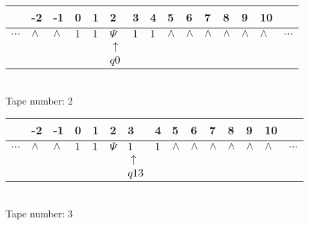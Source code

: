 \documentclass{article}
\begin{document}
\begin{table}[H]
\centering
\begin{tabular}{lllllllllllllll}
 & -2 & -1 & 0 & 1 & 2 & 3 & 4 & 5 & 6 & 7 & 8 & 9 & 10 & \\
\hline
$...$ & \multicolumn{1}{|l|}{$\wedge$} & \multicolumn{1}{|l|}{$\wedge$} & \multicolumn{1}{|l|}{$1$} & \multicolumn{1}{|l|}{$1$} & \multicolumn{1}{|l|}{$\Psi$} & \multicolumn{1}{|l|}{$1$} & \multicolumn{1}{|l|}{$1$} & \multicolumn{1}{|l|}{$\wedge$} & \multicolumn{1}{|l|}{$\wedge$} & \multicolumn{1}{|l|}{$\wedge$} & \multicolumn{1}{|l|}{$\wedge$} & \multicolumn{1}{|l|}{$\wedge$} & \multicolumn{1}{|l|}{$\wedge$} & $...$\\
\hline
&  &  &  &  & $\uparrow$ &  &  &  &  &  &  &  &  &  \\
&  &  &  &  & $ q0 $ &  &  &  &  &  &  &  &  &  \\
\end{tabular}
\\
Tape number: 2
\noindent\makebox[\linewidth]{\hdashrule{\textwidth}{1pt}{1pt}}\end{table}

\begin{table}[H]
\centering
\begin{tabular}{lllllllllllllll}
 & -2 & -1 & 0 & 1 & 2 & 3 & 4 & 5 & 6 & 7 & 8 & 9 & 10 & \\
\hline
$...$ & \multicolumn{1}{|l|}{$\wedge$} & \multicolumn{1}{|l|}{$\wedge$} & \multicolumn{1}{|l|}{$1$} & \multicolumn{1}{|l|}{$1$} & \multicolumn{1}{|l|}{$\Psi$} & \multicolumn{1}{|l|}{$1$} & \multicolumn{1}{|l|}{$1$} & \multicolumn{1}{|l|}{$\wedge$} & \multicolumn{1}{|l|}{$\wedge$} & \multicolumn{1}{|l|}{$\wedge$} & \multicolumn{1}{|l|}{$\wedge$} & \multicolumn{1}{|l|}{$\wedge$} & \multicolumn{1}{|l|}{$\wedge$} & $...$\\
\hline
&  &  &  &  &  & $\uparrow$ &  &  &  &  &  &  &  &  \\
&  &  &  &  &  & $ q13 $ &  &  &  &  &  &  &  &  \\
\end{tabular}
\\
Tape number: 3
\noindent\makebox[\linewidth]{\hdashrule{\textwidth}{1pt}{1pt}}\end{table}
\end{document}
